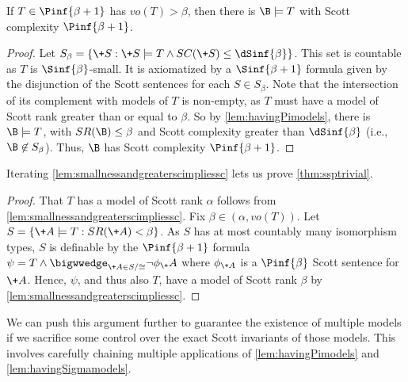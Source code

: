 \documentclass[10pt,a4paper]{amsart}
\renewcommand{\-}{\text{-}}
\begin{document}
\begin{lemma}\label{lem:smallnessandgreaterscimpliessc}
If $T\in \Pinf{\beta+1}$ has $vo(T)>\beta$, then there is $\B\models T$ with Scott complexity $\Pinf{\beta+1}$.\end{lemma}
\begin{proof}
  Let $S_\beta=\{ \+S: \+S\models T \land SC(\+S)\leq \dSinf{\beta}\}$. This set is countable as $T$ is $\Sinf{\beta}$-small. It is axiomatized by a $\Sinf{\beta+1}$ formula given by the disjunction of the Scott sentences for each $S\in S_\beta$. Note that the intersection of its complement with models of $T$ is non-empty, as $T$ must have a model of Scott rank greater than or equal to $\beta$. So by \cref{lem:havingPimodels}, there is $\B\models T$, with $SR(\B)\leq \beta$ and Scott complexity greater than $\dSinf{\beta}$ (i.e., $\B\not\in S_\beta$). Thus, $\B$ has Scott complexity $\Pinf{\beta+1}$.
\end{proof}
Iterating \cref{lem:smallnessandgreaterscimpliessc} lets us prove \cref{thm:ssptrivial}.
\ssptrivial* 
\begin{proof}
  That $T$ has a model of Scott rank $\alpha$ follows from \cref{lem:smallnessandgreaterscimpliessc}. Fix $\beta\in (\alpha,vo(T))$. Let $S=\{ \+A\models T: SR(\+A)<\beta\}$. As $S$ has at most countably many isomorphism types, $S$ is definable by the $\Pinf{\beta+1}$ formula $\psi=T\land \bigwwedge_{\+A\in S/{\cong}} \neg\phi_\+A$ where $\phi_{\+A}$ is a $\Pinf{\beta}$ Scott sentence for $\+A$. Hence, $\psi$, and thus also $T$, have a model of Scott rank $\beta$ by \cref{lem:smallnessandgreaterscimpliessc}.
\end{proof}
We can push this argument further to guarantee the existence of multiple models if we sacrifice some control over the exact Scott invariants of those models.
This involves carefully chaining multiple applications of \cref{lem:havingPimodels} and \cref{lem:havingSigmamodels}.
\end{document}
